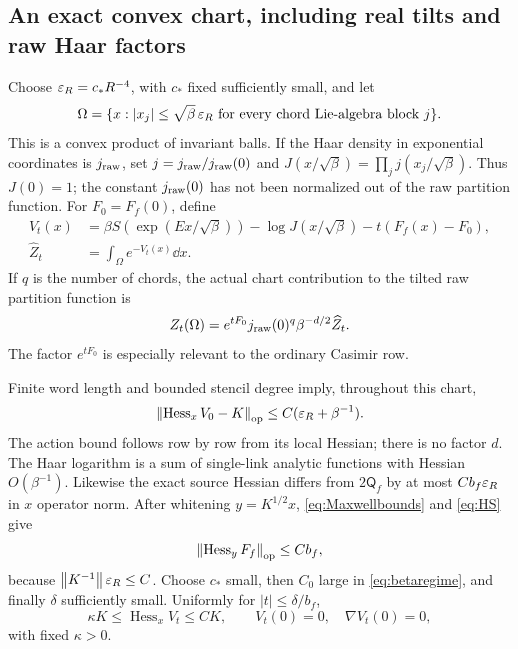 \documentclass[11pt,letterpaper]{article}
\numberwithin{equation}{section}
\theoremstyle{definition}\newtheorem{definition}[theorem]{Definition}
\theoremstyle{remark}\newtheorem{remark}[theorem]{Remark}
\newcommand{\norm}[1]{\left\lVert #1\right\rVert}
\newcommand{\Hess}{\operatorname{Hess}}
\begin{document}
\subsection{An exact convex chart, including real tilts and raw Haar factors}

Choose $\varepsilon_R=c_*R^{-4}$, with $c_*$ fixed sufficiently small, and let
\[
 \Omega=\{x:|x_j|\le\sqrt\beta\,\varepsilon_R
                   \text{ for every chord Lie-algebra block }j\}.
\]
This is a convex product of invariant balls. If the Haar density in exponential coordinates is $j_{\rm raw}$, set $j=j_{\rm raw}/j_{\rm raw}(0)$ and
$J(x/\sqrt\beta)=\prod_jj(x_j/\sqrt\beta)$. Thus $J(0)=1$; the constant $j_{\rm raw}(0)$ has not been normalized out of the raw partition function. For $F_0=F_f(0)$, define
\begin{align}
 V_t(x)&=\beta S(\exp(Ex/\sqrt\beta))
       -\log J(x/\sqrt\beta)-t(F_f(x)-F_0),\\
 \widehat Z_t&=\int_\Omega e^{-V_t(x)}\dd x.
 \label{eq:chartpotential}
\end{align}
If $q$ is the number of chords, the actual chart contribution to the tilted raw partition function is
\begin{equation}
 Z_t(\Omega)=e^{tF_0}
           j_{\rm raw}(0)^q\beta^{-d/2}\widehat Z_t.
 \label{eq:rawchart}
\end{equation}
The factor $e^{tF_0}$ is especially relevant to the ordinary Casimir row.

Finite word length and bounded stencil degree imply, throughout this chart,
\begin{equation}
 \norm{\Hess_xV_0-K}_{\rm op}
 \le C(\eps_R+\beta^{-1}).
 \label{eq:Vhessian}
\end{equation}
The action bound follows row by row from its local Hessian; there is no factor $d$. The Haar logarithm is a sum of single-link analytic functions with Hessian $O(\beta^{-1})$.
Likewise the exact source Hessian differs from $2\mathsf Q_f$ by at most $Cb_f\varepsilon_R$ in $x$ operator norm. After whitening $y=K^{1/2}x$, \eqref{eq:Maxwellbounds} and \eqref{eq:HS} give
\begin{equation}
 \norm{\Hess_yF_f}_{\rm op}\le Cb_f,
 \label{eq:sourcehessian}
\end{equation}
because $\norm{K^{-1}}\eps_R\le C$. Choose $c_*$ small, then $C_0$ large in \eqref{eq:betaregime}, and finally $\delta$ sufficiently small. Uniformly for $|t|\le\delta/b_f$,
\begin{equation}
 \kappa K\le\Hess_xV_t\le CK,
 \qquad V_t(0)=0,\quad\nabla V_t(0)=0,
 \label{eq:relativeconvexity}
\end{equation}
with fixed $\kappa>0$.
\end{document}
